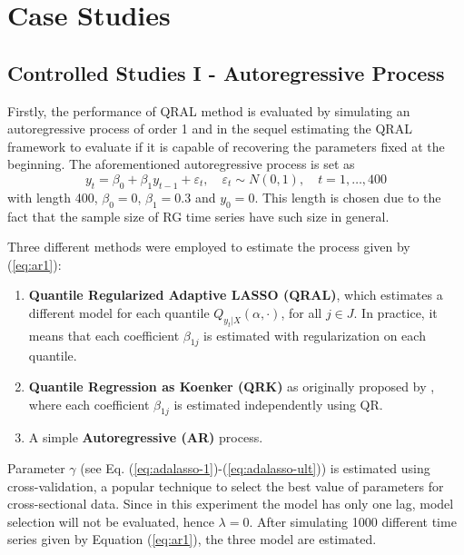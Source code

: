 \section{Case Studies}


\subsection{Controlled Studies I - Autoregressive Process} \label{sec:ar-study}


Firstly, the performance of QRAL method is evaluated by simulating an autoregressive process of order 1 and in the sequel estimating the QRAL framework to evaluate if it is capable of recovering the parameters fixed at the beginning. 
The aforementioned autoregressive process is set as
\begin{equation}
y_t = \beta_0 + \beta_1 y_{t-1} + \varepsilon_t, \quad \varepsilon_t \sim N(0, 1), \quad t=1,\dots,400 \label{eq:ar1}
\end{equation}
with length 400, $\beta_0 = 0$, $\beta_1 = 0.3$ and $y_0 = 0$. This length is chosen due to the fact that the sample size of RG time series have such size in general.

Three different methods were employed to estimate the process given by (\ref{eq:ar1}):
\begin{enumerate}
\item \textbf{Quantile Regularized Adaptive LASSO (QRAL)}, which estimates a different model for each quantile $Q_{y_t|X}(\alpha,\cdot)$, for all ${j \in J}$. In practice, it means that each coefficient $\beta_{1j}$ is estimated with regularization on each quantile. %
\item \textbf{Quantile Regression as Koenker (QRK)} as originally proposed by \cite{koenker1978regression}, where each coefficient $\beta_{1j}$ is estimated independently using QR. 
\item A simple \textbf{Autoregressive (AR)} process.
\end{enumerate}

Parameter $\gamma$ (see Eq. (\ref{eq:adalasso-1})-(\ref{eq:adalasso-ult})) is estimated using cross-validation, a popular technique to select the best value of parameters for cross-sectional data. 
Since in this experiment the model has only one lag, model selection will not be evaluated, hence $\lambda=0$.
After simulating 1000 different time series given by Equation (\ref{eq:ar1}), the three model are estimated.

